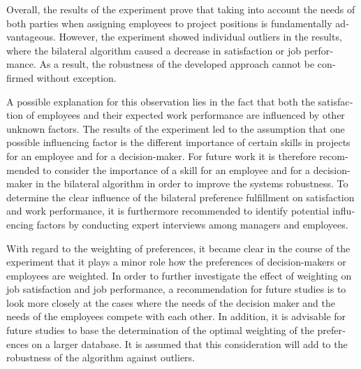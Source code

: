 \begin{otherlanguage}{american}
	Overall, the results of the experiment prove that taking into account the needs of both parties when assigning employees to project positions is fundamentally advantageous.
	However, the experiment showed individual outliers in the results, where the bilateral algorithm caused a decrease in satisfaction or job performance.
	As a result, the robustness of the developed approach cannot be confirmed without exception.

	A possible explanation for this observation lies in the fact that both the satisfaction of employees and their expected work performance are influenced by other unknown factors.
	The results of the experiment led to the assumption that one possible influencing factor is the different importance of certain skills in projects for an employee and for a decision-maker.
	For future work it is therefore recommended to consider the importance of a skill for an employee and for a decision-maker in the bilateral algorithm in order to improve the systems robustness.
	To determine the clear influence of the bilateral preference fulfillment on satisfaction and work performance, it is furthermore recommended to identify potential influencing factors by conducting expert interviews among managers and employees.

	With regard to the weighting of preferences, it became clear in the course of the experiment that it plays a minor role how the preferences of decision-makers or employees are weighted.
	In order to further investigate the effect of weighting on job satisfaction and job performance, a recommendation for future studies is to look more closely at the cases where the needs of the decision maker and the needs of the employees compete with each other.
	In addition, it is advisable for future studies to base the determination of the optimal weighting of the preferences on a larger database.
	It is assumed that this consideration will add to the robustness of the algorithm against outliers.

\end{otherlanguage}

